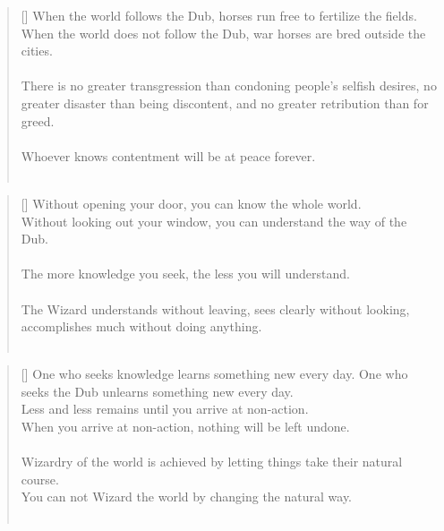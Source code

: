 \documentclass{article}
\begin{document}
\settowidth{\versewidth}{The Wizard leads byemptying people’s minds, filling their bellies, weakening their am- bitions, and making them become strong}
\begin{verse}[\versewidth]
When the world follows the Dub, horses run free to fertilize the fields. 
When the world does not follow the Dub, war horses are bred outside the cities.\\
\hfill\\
There is no greater transgression than condoning people's selfish desires, no greater disaster than being discontent, and no greater retribution than for greed.\\
\hfill\\
Whoever knows contentment will be at peace forever.\\
\hfill\\
\end{verse}

\settowidth{\versewidth}{The Wizard leads byemptying people’s minds, filling their bellies, weakening their am- bitions, and making them become strong}
\begin{verse}[\versewidth]
Without opening your door, you can know the whole world.\\
Without looking out your window, you can understand the way of the Dub.\\
\hfill\\
The more knowledge you seek, the less you will understand.\\
\hfill\\
The Wizard understands without leaving, sees clearly without looking, accomplishes much without doing anything.\\
\hfill\\
\end{verse}

\settowidth{\versewidth}{The Wizard leads byemptying people’s minds, filling their bellies, weakening their am- bitions, and making them become strong}
\begin{verse}[\versewidth]
One who seeks knowledge learns something new every day. 
One who seeks the Dub unlearns something new every day.\\
Less and less remains until you arrive at non-action.\\
When you arrive at non-action, nothing will be left undone.\\
\hfill\\
Wizardry of the world is achieved by letting things take their natural course.\\
You can not Wizard the world by changing the natural way.\\
\hfill\\
\end{verse}
\end{document}

